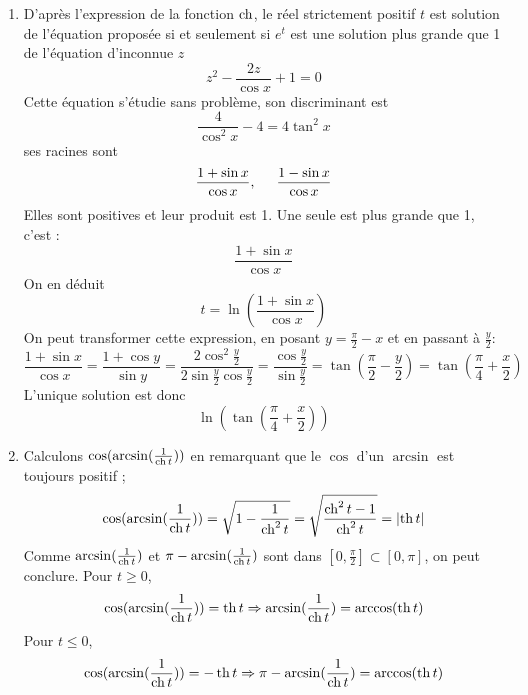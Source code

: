 \begin{enumerate}
\begin{enumerate}
\item D'apr{\`e}s l'expression de la fonction $\operatorname{ch}$, le réel strictement positif $t$ est solution de l'équation proposée si et seulement si $e^{t}$ est une solution plus grande que 1 de l'équation d'inconnue $z$
\begin{displaymath}z^{2}-\frac{2z}{\cos x}+1=0\end{displaymath}
Cette équation s'étudie sans problème, son discriminant est 
\begin{displaymath}
  \frac{4}{\cos^2 x} -4 = 4 \tan^2 x
\end{displaymath}
ses racines sont
\begin{displaymath}
\frac{1+ \sin x}{\cos x}, \hspace{0.5cm}\frac{1 - \sin x}{\cos x}  
\end{displaymath}
Elles sont positives et leur produit est 1. Une seule est plus grande que 1, c'est :
\begin{displaymath}
 \frac{1+\sin x}{\cos x}
\end{displaymath}
 On en d{\'e}duit
\begin{displaymath}
t=\ln (\frac{1+\sin x}{\cos x}) 
\end{displaymath}
On peut transformer cette expression, en posant $y=\frac{\pi}{2} - x$ et en passant à $\frac{y}{2}$:
\begin{displaymath}
\frac{1+\sin x}{\cos x} = \frac{1+\cos y}{\sin y} = \frac{2\cos^2 \frac{y}{2}}{2\sin\frac{y}{2}\cos\frac{y}{2}} 
= \frac{\cos\frac{y}{2}}{\sin \frac{y}{2}}  = \tan(\frac{\pi}{2}-\frac{y}{2}) = \tan(\frac{\pi}{4} + \frac{x}{2})
\end{displaymath}
L'unique solution est donc
\begin{displaymath}
  \ln\left( \tan(\frac{\pi}{4} + \frac{x}{2})\right) 
\end{displaymath}

\item Calculons $\cos (\arcsin (\frac{1}{\operatorname{ch} t}))$ en remarquant que le $\cos $ d'un $\arcsin $ est toujours positif ;
\begin{displaymath}
\cos (\arcsin (\frac{1}{\operatorname{ch} t}))=\sqrt{1-\frac{1}{\operatorname{ch} ^{2}t}}=\sqrt{\frac{\operatorname{ch} ^{2}t-1}{\operatorname{ch} ^{2}t}}=\left| \operatorname{th} t\right|
\end{displaymath}
Comme $\arcsin (\frac{1}{\operatorname{ch} t})$ et $\pi -\arcsin (\frac{1}{\operatorname{ch} t})$ sont dans $[0,\frac{\pi }{2}]\subset [0,\pi]$, on peut conclure.\newline 
Pour $t\geq 0$,
\begin{displaymath}
\cos (\arcsin (\frac{1}{\operatorname{ch} t}))=\operatorname{th} t \Rightarrow \arcsin (\frac{1}{\operatorname{ch} t})=\arccos (\operatorname{th} t)
\end{displaymath}
Pour $t\leq 0$,
\begin{displaymath}
\cos (\arcsin (\frac{1}{\operatorname{ch} t}))=-\operatorname{th} t \Rightarrow \pi - \arcsin (\frac{1}{\operatorname{ch} t})=\arccos (\operatorname{th} t)   
\end{displaymath}


\end{enumerate}
\end{enumerate}
